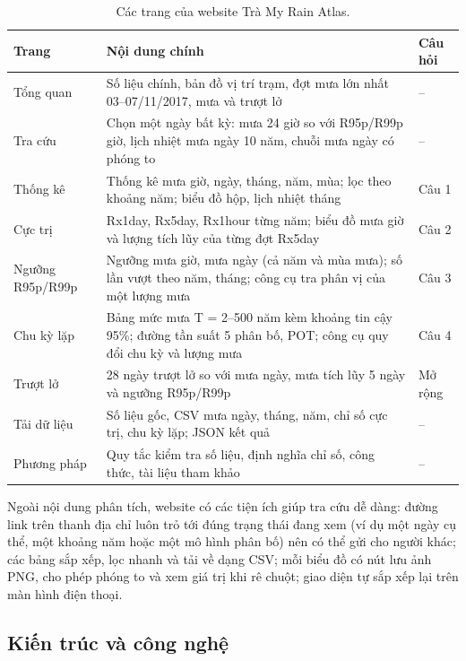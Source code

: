 \begin{table}[H]
  \centering
  \caption{Các trang của website Trà My Rain Atlas.}
  \label{tab:web-trang}
  \small
  \begin{tabularx}{\linewidth}{|>{\raggedright\arraybackslash}p{3.4cm}|L|>{\centering\arraybackslash}p{1.6cm}|}
    \hline
    \textbf{Trang} & \textbf{Nội dung chính} & \textbf{Câu hỏi} \\
    \hline
    Tổng quan & Số liệu chính, bản đồ vị trí trạm, đợt mưa lớn nhất 03--07/11/2017, mưa và trượt lở & -- \\ \hline
    Tra cứu & Chọn một ngày bất kỳ: mưa 24 giờ so với R95p/R99p giờ, lịch nhiệt mưa ngày 10 năm, chuỗi mưa ngày có phóng to & -- \\ \hline
    Thống kê & Thống kê mưa giờ, ngày, tháng, năm, mùa; lọc theo khoảng năm; biểu đồ hộp, lịch nhiệt tháng & Câu 1 \\ \hline
    Cực trị & Rx1day, Rx5day, Rx1hour từng năm; biểu đồ mưa giờ và lượng tích lũy của từng đợt Rx5day & Câu 2 \\ \hline
    Ngưỡng R95p/R99p & Ngưỡng mưa giờ, mưa ngày (cả năm và mùa mưa); số lần vượt theo năm, tháng; công cụ tra phân vị của một lượng mưa & Câu 3 \\ \hline
    Chu kỳ lặp & Bảng mức mưa T = 2--500 năm kèm khoảng tin cậy 95\%; đường tần suất 5 phân bố, POT; công cụ quy đổi chu kỳ và lượng mưa & Câu 4 \\ \hline
    Trượt lở & 28 ngày trượt lở so với mưa ngày, mưa tích lũy 5 ngày và ngưỡng R95p/R99p & Mở rộng \\ \hline
    Tải dữ liệu & Số liệu gốc, CSV mưa ngày, tháng, năm, chỉ số cực trị, chu kỳ lặp; JSON kết quả & -- \\ \hline
    Phương pháp & Quy tắc kiểm tra số liệu, định nghĩa chỉ số, công thức, tài liệu tham khảo & -- \\ \hline
  \end{tabularx}
\end{table}

Ngoài nội dung phân tích, website có các tiện ích giúp tra cứu dễ dàng: đường link trên thanh địa chỉ luôn trỏ tới đúng trạng thái đang xem (ví dụ một ngày cụ thể, một khoảng năm hoặc một mô hình phân bố) nên có thể gửi cho người khác; các bảng sắp xếp, lọc nhanh và tải về dạng CSV; mỗi biểu đồ có nút lưu ảnh PNG, cho phép phóng to và xem giá trị khi rê chuột; giao diện tự sắp xếp lại trên màn hình điện thoại.

\subsection{Kiến trúc và công nghệ}
\label{sec:web-kientruc}

